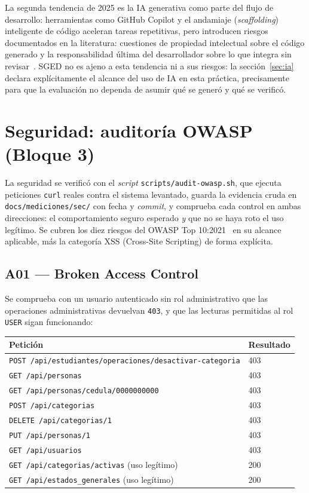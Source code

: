 \documentclass[11pt,a4paper]{article}
\newcommand{\ruta}[1]{\texttt{\footnotesize #1}}
\begin{document}
La segunda tendencia de 2025 es la IA generativa como parte del flujo de
desarrollo: herramientas como GitHub Copilot y el andamiaje
(\emph{scaffolding}) inteligente de código aceleran tareas repetitivas,
pero introducen riesgos documentados en la literatura: cuestiones de
propiedad intelectual sobre el código generado y la responsabilidad última
del desarrollador sobre lo que integra sin revisar~\cite{moradidakhel2023}.
SGED no es ajeno a esta tendencia ni a sus riesgos: la
sección~\ref{sec:ia} declara explícitamente el alcance del uso de IA en
esta práctica, precisamente para que la evaluación no dependa de asumir
qué se generó y qué se verificó.

\section{Seguridad: auditoría OWASP (Bloque 3)}
\label{sec:seguridad}

La seguridad se verificó con el \emph{script} \ruta{scripts/audit-owasp.sh},
que ejecuta peticiones \texttt{curl} reales contra el sistema levantado,
guarda la evidencia cruda en \ruta{docs/mediciones/sec/} con fecha y
\emph{commit}, y comprueba cada control en ambas direcciones: el
comportamiento seguro esperado \emph{y} que no se haya roto el uso legítimo.
Se cubren los diez riesgos del OWASP Top 10:2021~\cite{owasp2021} en su
alcance aplicable, más la categoría XSS (Cross-Site Scripting) de forma
explícita.

\subsection{A01 --- Broken Access Control}

Se comprueba con un usuario autenticado sin rol administrativo que las
operaciones administrativas devuelvan \texttt{403}, y que las lecturas
permitidas al rol \texttt{USER} sigan funcionando:

\begin{center}
\begin{tabular}{@{}ll@{}}
\toprule
\textbf{Petición} & \textbf{Resultado} \\
\midrule
\texttt{POST /api/estudiantes/operaciones/desactivar-categoria} & 403 \\
\texttt{GET /api/personas} & 403 \\
\texttt{GET /api/personas/cedula/0000000000} & 403 \\
\texttt{POST /api/categorias} & 403 \\
\texttt{DELETE /api/categorias/1} & 403 \\
\texttt{PUT /api/personas/1} & 403 \\
\texttt{GET /api/usuarios} & 403 \\
\midrule
\texttt{GET /api/categorias/activas} (uso legítimo) & 200 \\
\texttt{GET /api/estados\_generales} (uso legítimo) & 200 \\
\bottomrule
\end{tabular}
\end{center}
\end{document}

